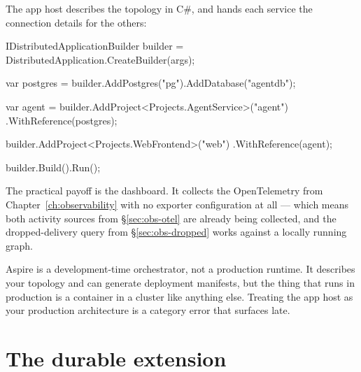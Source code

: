 The app host describes the topology in C\#, and hands each service the connection
details for the others:

\begin{csharp}[caption={The application, described}, label={lst:host-apphost}]
IDistributedApplicationBuilder builder = DistributedApplication.CreateBuilder(args);

var postgres = builder.AddPostgres("pg").AddDatabase("agentdb");

var agent = builder.AddProject<Projects.AgentService>("agent")
                   .WithReference(postgres);

builder.AddProject<Projects.WebFrontend>("web")
       .WithReference(agent);

builder.Build().Run();
\end{csharp}

The practical payoff is the dashboard. It collects the OpenTelemetry from
Chapter~\ref{ch:observability} with no exporter configuration at all --- which
means both activity sources from \S\ref{sec:obs-otel} are already being
collected, and the dropped-delivery query from \S\ref{sec:obs-dropped} works
against a locally running graph.

\begin{note}
Aspire is a development-time orchestrator, not a production runtime. It describes
your topology and can generate deployment manifests, but the thing that runs in
production is a container in a cluster like anything else. Treating the app host
as your production architecture is a category error that surfaces late.
\end{note}


\section{The durable extension}
\label{sec:host-durable}

